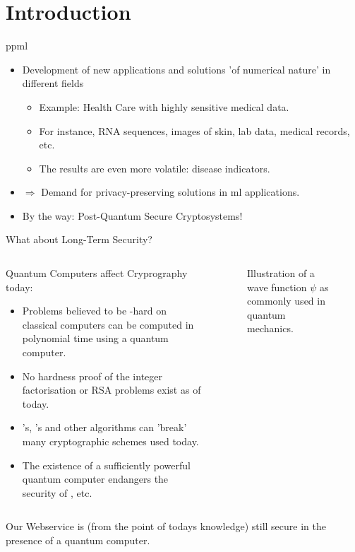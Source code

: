 \section{Introduction}
\begin{frame}{\gls{ppml}}
  \begin{itemize}
    \item Development of new applications and solutions 'of numerical nature' in different fields
          \begin{itemize}
            \item Example: Health Care with highly sensitive medical data.
            \item For instance, RNA sequences, images of skin, lab data, medical records, etc.
            \item The results are even more volatile: disease indicators.
          \end{itemize}
    \item $\Rightarrow$ Demand for privacy-preserving solutions in \gls{ml} applications.
    \item By the way: Post-Quantum Secure Cryptosystems!
  \end{itemize}
\end{frame}

\begin{frame}{What about Long-Term Security?}
  \begin{columns}
    \begin{column}{0.6\linewidth}
      Quantum Computers affect Cryprography today:
      \begin{itemize}
        \item Problems believed to be -hard on classical computers can be computed in polynomial time using a quantum computer.
        \item No hardness proof of the integer factorisation or RSA problems exist as of today.
        \item {}'s, 's and other algorithms can 'break' many cryptographic schemes used today.
        \item The existence of a sufficiently powerful quantum computer endangers the security of , etc.
      \end{itemize}
    \end{column}
    \begin{column}{0.4\linewidth}
      \vspace{-0.3cm}
      \begin{figure}[H]
        \centering
        \caption{Illustration of a wave function $\psi$ as commonly used in quantum mechanics.}
        \label{fig:wave-function}
      \end{figure}
    \end{column}
  \end{columns}
  Our Webservice is (from the point of todays knowledge) still secure in the presence of a quantum computer.
\end{frame}

